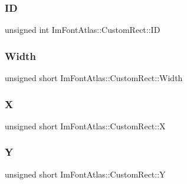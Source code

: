 \subsubsection{\texorpdfstring{ID}{ID}}
{\footnotesize\ttfamily unsigned int Im\+Font\+Atlas\+::\+Custom\+Rect\+::\+ID}

\hypertarget{struct_im_font_atlas_1_1_custom_rect_a961e02b6cda1eb69dfd2f2d40ae40d5f}{}\label{struct_im_font_atlas_1_1_custom_rect_a961e02b6cda1eb69dfd2f2d40ae40d5f} 
\subsubsection{\texorpdfstring{Width}{Width}}
{\footnotesize\ttfamily unsigned short Im\+Font\+Atlas\+::\+Custom\+Rect\+::\+Width}

\hypertarget{struct_im_font_atlas_1_1_custom_rect_af080bc8663332dfd5576d9a6a5313089}{}\label{struct_im_font_atlas_1_1_custom_rect_af080bc8663332dfd5576d9a6a5313089} 
\subsubsection{\texorpdfstring{X}{X}}
{\footnotesize\ttfamily unsigned short Im\+Font\+Atlas\+::\+Custom\+Rect\+::X}

\hypertarget{struct_im_font_atlas_1_1_custom_rect_ae1739c480b82fa11ebdd1edb9e3cf5eb}{}\label{struct_im_font_atlas_1_1_custom_rect_ae1739c480b82fa11ebdd1edb9e3cf5eb} 
\subsubsection{\texorpdfstring{Y}{Y}}
{\footnotesize\ttfamily unsigned short Im\+Font\+Atlas\+::\+Custom\+Rect\+::Y}

